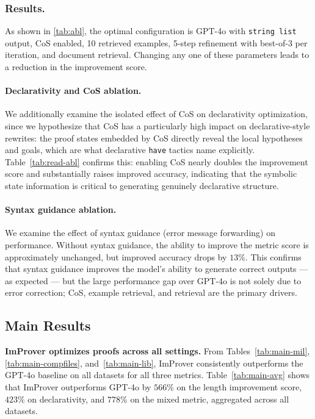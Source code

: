 \subsubsection{Results.} As shown in \autoref{tab:abl}, the optimal configuration is GPT-4o with \texttt{string list} output, CoS enabled, 10 retrieved examples, 5-step refinement with best-of-3 per iteration, and document retrieval. Changing any one of these parameters leads to a reduction in the improvement score.





\paragraph{Declarativity and CoS ablation.} We additionally examine the isolated effect of CoS on declarativity optimization, since we hypothesize that CoS has a particularly high impact on declarative-style rewrites: the proof states embedded by CoS directly reveal the local hypotheses and goals, which are what declarative \texttt{have} tactics name explicitly. Table~\ref{tab:read-abl} confirms this: enabling CoS nearly doubles the improvement score and substantially raises improved accuracy, indicating that the symbolic state information is critical to generating genuinely declarative structure.

\paragraph{Syntax guidance ablation.} We examine the effect of syntax guidance (error message forwarding) on performance. Without syntax guidance, the ability to improve the metric score is approximately unchanged, but improved accuracy drops by $13\%$. This confirms that syntax guidance improves the model's ability to generate correct outputs --- as expected --- but the large performance gap over GPT-4o is not solely due to error correction; CoS, example retrieval, and retrieval are the primary drivers.

\subsection{Main Results}





\textbf{ImProver optimizes proofs across all settings.} From Tables~\ref{tab:main-mil}, \ref{tab:main-compfiles}, and~\ref{tab:main-lib}, ImProver consistently outperforms the GPT-4o baseline on all datasets for all three metrics. Table~\ref{tab:main-avg} shows that ImProver outperforms GPT-4o by $566\%$ on the length improvement score, $423\%$ on declarativity, and $778\%$ on the mixed metric, aggregated across all datasets.

